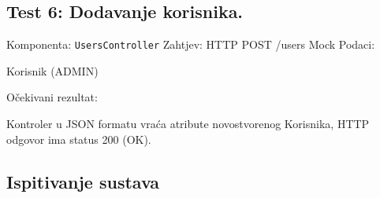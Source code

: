 			\subsection*{Test 6: Dodavanje korisnika.}
			Komponenta: \lstinline[language=Java]{UsersController} \newline
			Zahtjev: HTTP POST /users \newline
			Mock Podaci:
			\begin{packed_item}
				\item Korisnik (ADMIN)
			\end{packed_item}
			Očekivani rezultat:
			\begin{packed_item}
				\item Kontroler u JSON formatu vraća atribute novostvorenog Korisnika, HTTP odgovor ima status 200 (OK).
			\end{packed_item}
			
			\subsection{Ispitivanje sustava}
			
			 
	
			\eject
